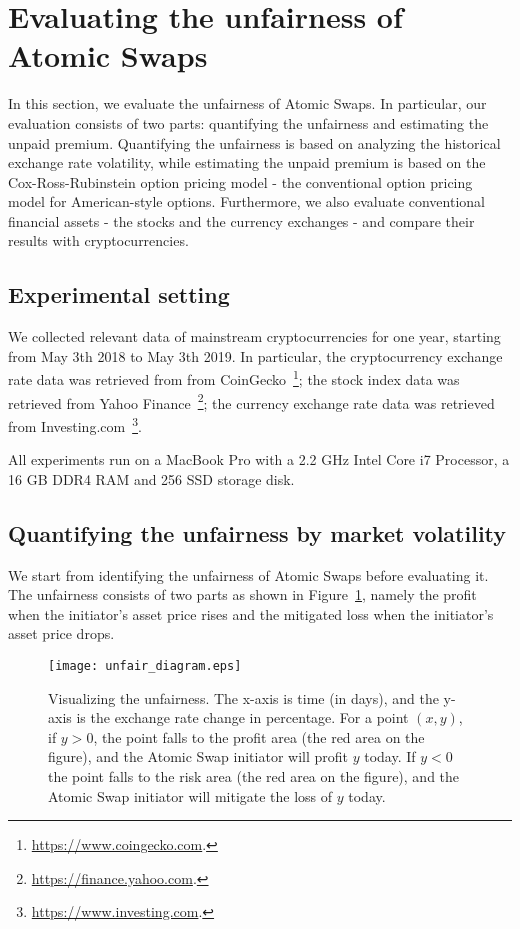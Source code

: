 \section{Evaluating the unfairness of Atomic Swaps}
\label{sec:evaluation}

In this section, we evaluate the unfairness of Atomic Swaps.
In particular, our evaluation consists of two parts: quantifying the unfairness and estimating the unpaid premium.
Quantifying the unfairness is based on analyzing the historical exchange rate volatility, while estimating the unpaid premium is based on the Cox-Ross-Rubinstein option pricing model - the conventional option pricing model for American-style options.
Furthermore, we also evaluate conventional financial assets - the stocks and the currency exchanges - and compare their results with cryptocurrencies.

\subsection{Experimental setting}

We collected relevant data of mainstream cryptocurrencies for one year, starting from May 3th 2018 to May 3th 2019.
In particular, the cryptocurrency exchange rate data was retrieved from from CoinGecko~\footnote{\url{https://www.coingecko.com}.};
the stock index data was retrieved from Yahoo Finance~\footnote{\url{https://finance.yahoo.com}.};
the currency exchange rate data was retrieved from Investing.com~\footnote{\url{https://www.investing.com}.}.

All experiments run on a MacBook Pro with a 2.2 GHz Intel Core i7 Processor, a 16 GB DDR4 RAM and 256 SSD storage disk.

\subsection{Quantifying the unfairness by market volatility}
\label{subsec:volatility_analysis}

We start from identifying the unfairness of Atomic Swaps before evaluating it.
The unfairness consists of two parts as shown in Figure~\ref{fig:unfair_diagram}, namely the profit when the initiator's asset price rises and the mitigated loss when the initiator's asset price drops.

\begin{figure}
    \texttt{[image: unfair\_diagram.eps]}
    \caption{Visualizing the unfairness. The x-axis is time (in days), and the y-axis is the exchange rate change in percentage. For a point $(x, y)$, if $y > 0$, the point falls to the profit area (the red area on the figure), and the Atomic Swap initiator will profit $y$ today. If $y < 0$ the point falls to the risk area (the red area on the figure), and the Atomic Swap initiator will mitigate the loss of $y$ today.}
    \label{fig:unfair_diagram}
\end{figure}

